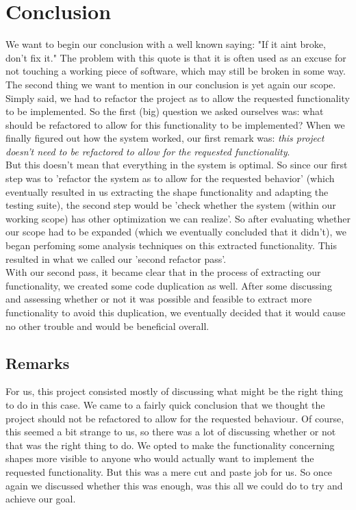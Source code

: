 \documentclass{article}
\begin{document}
\newpage
\section{Conclusion}

We want to begin our conclusion with a well known saying: "If it aint broke, don't fix it." The problem with this quote is that it is often used as an excuse for not touching a working piece of software, which may still be broken in some way.\cite{srboek}\\ 

The second thing we want to mention in our conclusion is yet again our scope. Simply said, we had to refactor the project as to allow the requested functionality to be implemented. So the first (big) question we asked ourselves was: what should be refactored to allow for this functionality to be implemented? When we finally figured out how the system worked, our first remark was: \textit{this project doesn't need to be refactored to allow for the requested functionality}.\\

But this doesn't mean that everything in the system is optimal. So since our first step was to 'refactor the system as to allow for the requested behavior' (which eventually resulted in us extracting the shape functionality and adapting the testing suite), the second step would be 'check whether the system (within our working scope) has other optimization we can realize'. So after evaluating whether our scope had to be expanded (which we eventually concluded that it didn't), we began perfoming some analysis techniques on this extracted functionality. This resulted in what we called our 'second refactor pass'.\\

With our second pass, it became clear that in the process of extracting our functionality, we created some code duplication as well. After some discussing and assessing whether or not it was possible and feasible to extract more functionality to avoid this duplication, we eventually decided that it would cause no other trouble and would be beneficial overall.\\



\subsection{Remarks}

For us, this project consisted mostly of discussing what might be the right thing to do in this case. We came to a fairly quick conclusion that we thought the project should not be refactored to allow for the requested behaviour. Of course, this seemed a bit strange to us, so there was a lot of discussing whether or not that was the right thing to do. We opted to make the functionality concerning shapes more visible to anyone who would actually want to implement the requested functionality. But this was a mere cut and paste job for us. So once again we discussed whether this was enough, was this all we could do to try and achieve our goal.\\
\end{document}
